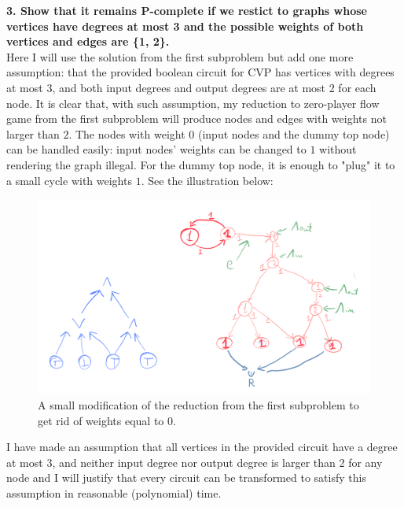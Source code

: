 \noindent
\textbf{
      3. Show that it remains P-complete if we restict to graphs whose vertices have
      degrees at most 3 and the possible weights of both vertices and edges are
      \{1, 2\}.
}\\
Here I will use the solution from the first subproblem but add one more assumption: that the provided
boolean circuit for CVP has vertices with degrees at most $3$, and both input degrees and output degrees
are at most 2 for each node.
It is clear that, with such assumption, my reduction to zero-player flow game from the first subproblem
will produce nodes and edges with weights not larger than $2$. The nodes with weight $0$ (input nodes
and the dummy top node) can be handled easily: input nodes' weights can be changed to $1$ without rendering
the graph illegal. For the dummy top node, it is enough to "plug" it to a small cycle with weights $1$.
See the illustration below:
\begin{figure}[H]
      \centering
      \caption{A small modification of the reduction from the first subproblem to get rid of weights equal to $0$.}
      \includegraphics[scale=0.2]{content/graphics/game16.png}
\end{figure}
I have made an assumption that all vertices in the provided circuit have a degree at most 3, and neither input degree
nor output degree is larger than 2 for any node and I will justify that every circuit can be transformed to satisfy this
assumption in reasonable (polynomial) time.

